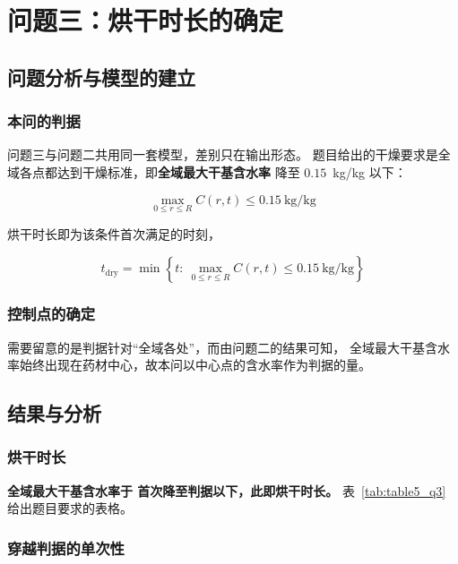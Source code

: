 \section{问题三：烘干时长的确定}

\subsection{问题分析与模型的建立}

\subsubsection{本问的判据}

问题三与问题二共用同一套模型，差别只在输出形态。
题目给出的干燥要求是全域各点都达到干燥标准，即\textbf{全域最大干基含水率}
降至 $0.15$~kg/kg 以下：

\begin{equation*}
  \max_{0\le r\le R}C(r,t)\le 0.15~\text{kg/kg}
\end{equation*}

烘干时长即为该条件首次满足的时刻，

\begin{equation*}
  t_{\mathrm{dry}}=\min\left\{t:\ \max_{0\le r\le R}C(r,t)\le 0.15~\text{kg/kg}\right\}
\end{equation*}

\subsubsection{控制点的确定}

需要留意的是判据针对“全域各处”，而由问题二的结果可知，
全域最大干基含水率始终出现在药材中心，故本问以中心点的含水率作为判据的量。

\subsection{结果与分析}

\subsubsection{烘干时长}

\textbf{全域最大干基含水率于 \qthreedryingtime 首次降至判据以下，此即烘干时长。}
表~\ref{tab:table5_q3} 给出题目要求的表格。



\subsubsection{穿越判据的单次性}


